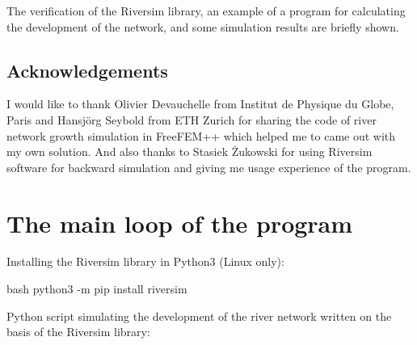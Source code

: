 \documentclass[]{pracamgr}
\begin{document}
    The verification of the Riversim library, an example of a program for calculating the development of the network, and some simulation results are briefly shown.\par

    \section*{Acknowledgements}
      
      I would like to thank Olivier Devauchelle from Institut de Physique du Globe, Paris and Hansjörg Seybold from ETH Zurich for sharing the code of river network growth simulation in FreeFEM++ which helped me to came out with my own solution. And also thanks to Stasiek Żukowski for using Riversim software for backward simulation and giving me usage experience of the program.

    

  \appendix

  \chapter{The main loop of the program}
    
    Installing the Riversim library in Python3 (Linux only):
    
    \begin{mintedbox}{bash} 
      python3 -m pip install riversim\end{mintedbox}
    
    Python script simulating the development of the river network written on the basis of the Riversim library:
\end{document}
